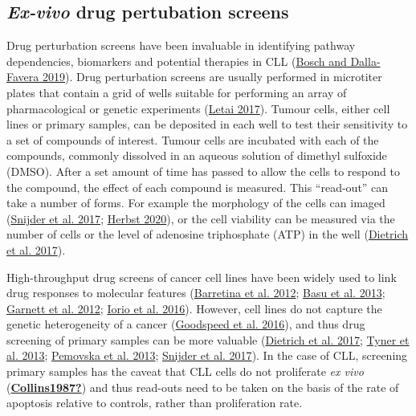 \documentclass[11pt, a4paper, twosided]{book}
\begin{document}
\hypertarget{drug-perturbation-screens-intro}{%
\subsection{\texorpdfstring{\emph{Ex-vivo} drug pertubation screens}{Ex-vivo drug pertubation screens}}\label{drug-perturbation-screens-intro}}

Drug perturbation screens have been invaluable in identifying pathway dependencies, biomarkers and potential therapies in CLL (\protect\hyperlink{ref-Bosch2019}{Bosch and Dalla-Favera 2019}). Drug perturbation screens are usually performed in microtiter plates that contain a grid of wells suitable for performing an array of pharmacological or genetic experiments (\protect\hyperlink{ref-Letai2017}{Letai 2017}). Tumour cells, either cell lines or primary samples, can be deposited in each well to test their sensitivity to a set of compounds of interest. Tumour cells are incubated with each of the compounds, commonly dissolved in an aqueous solution of dimethyl sulfoxide (DMSO). After a set amount of time has passed to allow the cells to respond to the compound, the effect of each compound is measured. This ``read-out'' can take a number of forms. For example the morphology of the cells can imaged (\protect\hyperlink{ref-Snijder2017}{Snijder et al. 2017}; \protect\hyperlink{ref-HerbstThesis}{Herbst 2020}), or the cell viability can be measured via the number of cells or the level of adenosine triphosphate (ATP) in the well (\protect\hyperlink{ref-JCIpaper}{Dietrich et al. 2017}).

High-throughput drug screens of cancer cell lines have been widely used to link drug responses to molecular features (\protect\hyperlink{ref-Barretina2012}{Barretina et al. 2012}; \protect\hyperlink{ref-Basu2013}{Basu et al. 2013}; \protect\hyperlink{ref-Garnett2012}{Garnett et al. 2012}; \protect\hyperlink{ref-Iorio2016}{Iorio et al. 2016}). However, cell lines do not capture the genetic heterogeneity of a cancer (\protect\hyperlink{ref-Goodspeed2016}{Goodspeed et al. 2016}), and thus drug screening of primary samples can be more valuable (\protect\hyperlink{ref-JCIpaper}{Dietrich et al. 2017}; \protect\hyperlink{ref-Tyner2013}{Tyner et al. 2013}; \protect\hyperlink{ref-Pemovska2013}{Pemovska et al. 2013}; \protect\hyperlink{ref-Snijder2017}{Snijder et al. 2017}). In the case of CLL, screening primary samples has the caveat that CLL cells do not proliferate \emph{ex vivo} (\protect\hyperlink{ref-Collins1987}{\textbf{Collins1987?}}) and thus read-outs need to be taken on the basis of the rate of apoptosis relative to controls, rather than proliferation rate.
\end{document}
